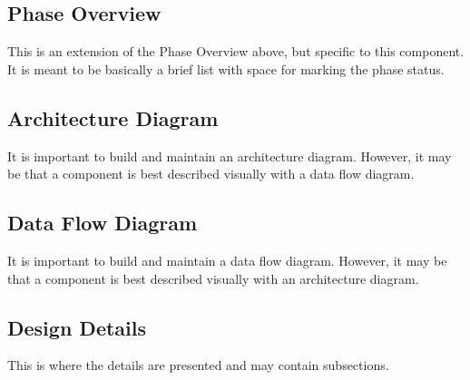 \subsection{Phase Overview}
This is an extension of the Phase Overview above, but specific to this component. 
 It is meant to be basically a brief list with space for marking the phase status. 

\subsection{ Architecture  Diagram}
It is important to build and maintain an architecture diagram.  However, it may 
be that a component is best described visually with a data flow diagram. 


\subsection{Data Flow Diagram}
It is important to build and maintain a data flow diagram.  However, it may be 
that a component is best described visually with an architecture diagram. 


\subsection{Design Details}
This is where the details are presented and may contain subsections. 


